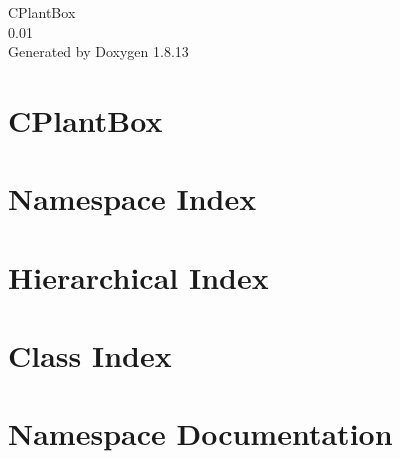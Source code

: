 \documentclass[twoside]{book}
\newcommand{\+}{\discretionary{\mbox{\scriptsize$\hookleftarrow$}}{}{}}
\newcommand{\clearemptydoublepage}{%
  \newpage{\pagestyle{empty}\cleardoublepage}%
}
\begin{document}
\hypersetup{pageanchor=false,
             bookmarksnumbered=true,
             pdfencoding=unicode
            }
\begin{titlepage}
\vspace*{7cm}
\begin{center}%
{\Large C\+Plant\+Box \\[1ex]\large 0.\+01 }\\
\vspace*{1cm}
{\large Generated by Doxygen 1.8.13}\\
\end{center}
\end{titlepage}
\clearemptydoublepage
{}
\tableofcontents
\clearemptydoublepage
{}
\hypersetup{pageanchor=true}

\chapter{C\+Plant\+Box}
\label{index}\hypertarget{index}{}
\chapter{Namespace Index}

\chapter{Hierarchical Index}

\chapter{Class Index}

\chapter{Namespace Documentation}

\end{document}

